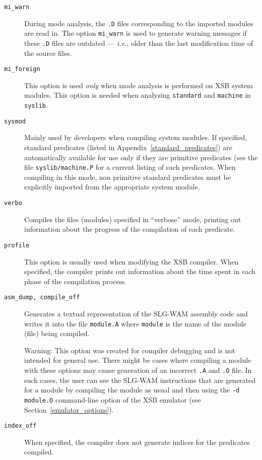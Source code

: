\begin{description}
\item[{\tt mi\_warn}]
	During mode analysis, the {\tt .D} files corresponding to the
	imported modules are read in. The option {\tt mi\_warn} is used
	to generate warning messages if these {\tt .D} files are 
	outdated --- {\em i.e.}, older
	than the last modification time of the source files.

\item[{\tt mi\_foreign}] This option is used {\em only\/} when mode analysis
	is performed on XSB system modules. This option is
	needed when analyzing {\tt standard} and {\tt machine} in
	{\tt syslib}.


\item[{\tt sysmod}] Mainly used by developers when compiling system
	modules. If specified, standard predicates (listed in
	Appendix~\ref{standard_predicates}) are automatically
	available for use only if they are primitive predicates (see
	the file {\tt syslib/machine.P} for a current listing of such
	predicates. When compiling in this
	mode, non primitive standard predicates must be explicitly
	imported from the appropriate system module.
\item[{\tt verbo}] Compiles the files (modules) specified in ``verbose'' mode, 
	printing out information about the progress of the compilation of each 
	predicate.
\item[{\tt profile}] This option is usually used when modifying the
	XSB compiler.  When specified, the compiler prints out
	information about the time spent in each phase of the
	compilation process.

\item[{\tt asm\_dump, compile\_off}] Generates a textual representation of 
	the SLG-WAM assembly code and writes it into the file {\tt module.A}
	where {\tt module} is the name of the module (file) being compiled.  
	
	{\sc Warning:} This option was created for compiler debugging and is
		not intended for general use.  There might be cases where
		compiling a module with these options may cause generation
		of an incorrect {\tt .A} and {\tt .O} file.  In such cases,
		the user can see the SLG-WAM instructions that are
		generated for a module by compiling the module as usual and
		then using the {\tt -d module.O} command-line option of the
		XSB emulator (see Section~\ref{emulator_options}).
\item[{\tt index\_off}] When specified, the compiler does not generate indices
	for the predicates compiled.  
\end{description}


